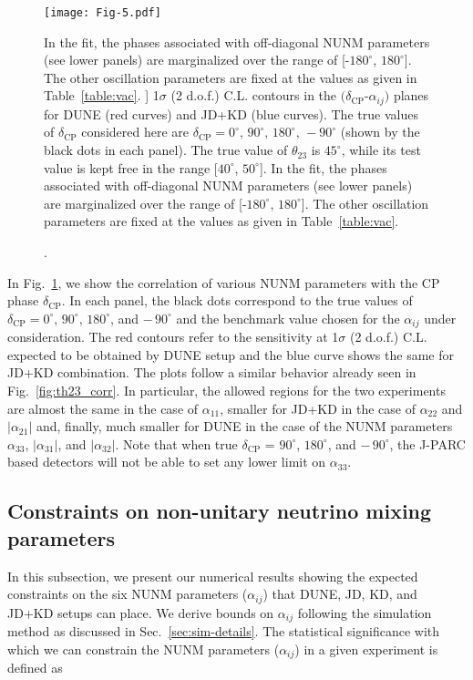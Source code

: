 \documentclass[11pt,a4paper]{article}
\newcommand{\capdef}{}
\newcommand{\mycaption}[2][\capdef]{\renewcommand{\capdef}{#2}
	\caption[#1]{{\footnotesize #2}}}
\begin{document}
\begin{figure}[tbp]
\centering
\texttt{[image: Fig-5.pdf]}
\mycaption{
1$\sigma$ (2 d.o.f.) C.L. contours in the $(\delta_{\mathrm{CP}}$-$\alpha_{ij})$ planes for DUNE (red curves) and JD+KD (blue curves). The true values of $\delta_{\mathrm{CP}}$ considered here are $\delta_{\mathrm{CP}}=0^{\circ},\, 90^{\circ},\, 180^{\circ},\, -90^{\circ}$ (shown by the black dots in each panel). The true value of $\theta_{23}$ is $45^{\circ}$, while its test value is kept free in the range [$40^{\circ}$, $50^{\circ}$]. In the fit, the phases associated with off-diagonal NUNM parameters (see lower panels) are marginalized over the range of [-$180^{\circ}$, $180^{\circ}$]. The other oscillation parameters are fixed at the values as given in Table~\ref{table:vac}.
}
\label{fig:dcp_corr}
\end{figure}


In Fig.~\ref{fig:dcp_corr}, we show the correlation of various NUNM parameters with the CP phase $\delta_{\mathrm{CP}}$.
In each panel, the black dots correspond to the true values of $\delta_{\mathrm{CP}}=0^{\circ},\, 90^{\circ},\, 180^{\circ}$, and $-\,90^{\circ}$ and the benchmark value chosen for the $\alpha_{ij}$ under consideration. The red contours refer to the sensitivity at 1$\sigma$ (2 d.o.f.) C.L. expected to be obtained by DUNE setup and the blue curve shows the same for JD+KD combination. The plots follow a similar behavior already seen in Fig.~\ref{fig:th23_corr}. In particular, the allowed regions for the two experiments are almost the same in the case of $\alpha_{11}$, smaller for JD+KD in the case of $\alpha_{22}$ and $|\alpha_{21}|$ and, finally, much smaller for DUNE in the case of the NUNM parameters $\alpha_{33}$, $|\alpha_{31}|$, and $|\alpha_{32}|$. Note that when true $\delta_{\mathrm{CP}}$ = $90^{\circ}$, $180^{\circ}$, and $-\,90^{\circ}$, the J-PARC based detectors will not be able to set any lower limit on $\alpha_{33}$.


\subsection{Constraints on non-unitary neutrino mixing parameters}
\label{subsec:num_results}

In this subsection, we present our numerical results showing the expected constraints on the six NUNM parameters ($\alpha_{ij}$) that DUNE, JD, KD, and JD+KD setups can place. 
We derive bounds on $\alpha_{ij}$ following the simulation method as discussed in Sec.~\ref{sec:sim-details}.
The statistical significance with which we can constrain the NUNM parameters ($\alpha_{ij}$) in a given experiment is defined as 
\end{document}
